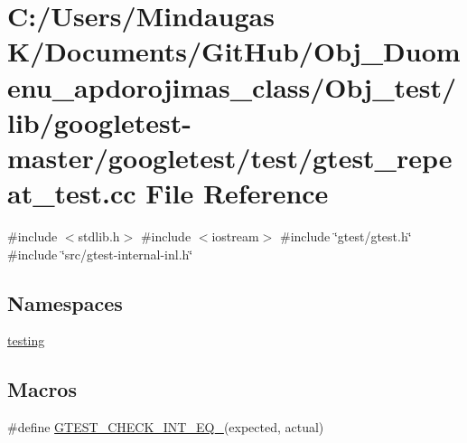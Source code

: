 \hypertarget{_obj__test_2lib_2googletest-master_2googletest_2test_2gtest__repeat__test_8cc}{}\section{C\+:/\+Users/\+Mindaugas K/\+Documents/\+Git\+Hub/\+Obj\+\_\+\+Duomenu\+\_\+apdorojimas\+\_\+class/\+Obj\+\_\+test/lib/googletest-\/master/googletest/test/gtest\+\_\+repeat\+\_\+test.cc File Reference}
\label{_obj__test_2lib_2googletest-master_2googletest_2test_2gtest__repeat__test_8cc}
{\ttfamily \#include $<$stdlib.\+h$>$}\newline
{\ttfamily \#include $<$iostream$>$}\newline
{\ttfamily \#include \char`\"{}gtest/gtest.\+h\char`\"{}}\newline
{\ttfamily \#include \char`\"{}src/gtest-\/internal-\/inl.\+h\char`\"{}}\newline
\subsection*{Namespaces}
\begin{DoxyCompactItemize}
\item 
 \mbox{\hyperlink{namespacetesting}{testing}}
\end{DoxyCompactItemize}
\subsection*{Macros}
\begin{DoxyCompactItemize}
\item 
\#define \mbox{\hyperlink{_obj__test_2lib_2googletest-master_2googletest_2test_2gtest__repeat__test_8cc_a7e5ba7c523079f679398b4c730184de3}{G\+T\+E\+S\+T\+\_\+\+C\+H\+E\+C\+K\+\_\+\+I\+N\+T\+\_\+\+E\+Q\+\_\+}}(expected,  actual)
\end{DoxyCompactItemize}
